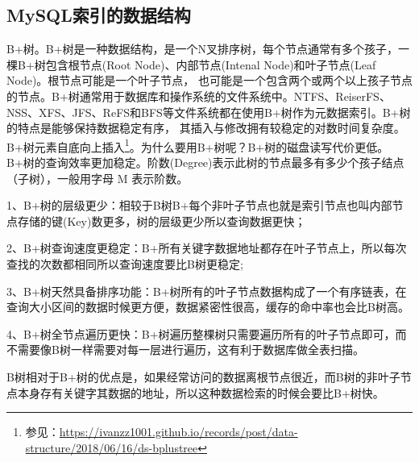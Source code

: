 \documentclass[../../../interview-questions.tex]{subfiles}
\begin{document}
\subsection{MySQL索引的数据结构}

B+树。B+树是一种数据结构，是一个N叉排序树，每个节点通常有多个孩子，一棵B+树包含根节点(Root Node)、内部节点(Intenal Node)和叶子节点(Leaf Node)。根节点可能是一个叶子节点， 也可能是一个包含两个或两个以上孩子节点的节点。B+树通常用于数据库和操作系统的文件系统中。NTFS、ReiserFS、NSS、XFS、JFS、ReFS和BFS等文件系统都在使用B+树作为元数据索引。B+树的特点是能够保持数据稳定有序， 其插入与修改拥有较稳定的对数时间复杂度。B+树元素自底向上插入\footnote{参见：\url{https://ivanzz1001.github.io/records/post/data-structure/2018/06/16/ds-bplustree}}。为什么要用B+树呢？B+树的磁盘读写代价更低。B+树的查询效率更加稳定。阶数(Degree)表示此树的节点最多有多少个孩子结点（子树），一般用字母 M 表示阶数。

1、B+树的层级更少：相较于B树B+每个非叶子节点也就是索引节点也叫内部节点存储的键(Key)数更多，树的层级更少所以查询数据更快；

2、B+树查询速度更稳定：B+所有关键字数据地址都存在叶子节点上，所以每次查找的次数都相同所以查询速度要比B树更稳定;

3、B+树天然具备排序功能：B+树所有的叶子节点数据构成了一个有序链表，在查询大小区间的数据时候更方便，数据紧密性很高，缓存的命中率也会比B树高。

4、B+树全节点遍历更快：B+树遍历整棵树只需要遍历所有的叶子节点即可，而不需要像B树一样需要对每一层进行遍历，这有利于数据库做全表扫描。

B树相对于B+树的优点是，如果经常访问的数据离根节点很近，而B树的非叶子节点本身存有关键字其数据的地址，所以这种数据检索的时候会要比B+树快。
\end{document}
